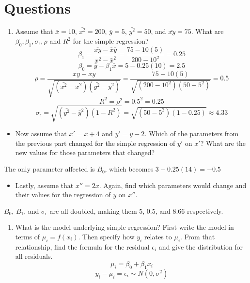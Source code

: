 \documentclass[
]{article}
\providecommand{\tightlist}{%
  \setlength{\itemsep}{0pt}\setlength{\parskip}{0pt}}
\begin{document}
\hypertarget{questions}{%
\section{Questions}\label{questions}}

\begin{enumerate}
\def\labelenumi{\arabic{enumi}.}
\tightlist
\item
  Assume that \(\bar{x}= 10\), \(\bar{x^2} = 200\), \(\bar{y} = 5\),
  \(\bar{y^2} = 50\), and \(\bar{xy} = 75\). What are
  \(\beta_0, \beta_1, \sigma_{\epsilon}, \rho\) and \(R^2\) for the
  simple regression?
  \[\beta_1=\frac{\bar{xy}-\bar{x}\bar{y}}{\bar{x^2}-\bar{x}^2}=\frac{75-10(5)}{200-10^2}=\boxed{0.25}\]
  \[\beta_0=\bar{y}-\beta_1\bar{x}=5-0.25(10)=\boxed{2.5}\]
  \[\rho=\frac{\bar{xy}-\bar{x}\bar{y}}{\sqrt{(\bar{x^2}-\bar{x}^2)(\bar{y^2}-\bar{y}^2)}}=\frac{75-10(5)}{\sqrt{(200-10^2)(50-5^2)}}=\boxed{0.5}\]
  \[R^2=\rho^2=0.5^2=\boxed{0.25}\]
  \[\sigma_\epsilon=\sqrt{(\bar{y^2}-\bar{y}^2)(1-R^2)}=\sqrt{(50-5^2)(1-0.25)}\approx\boxed{4.33}\]
\end{enumerate}

\begin{itemize}
\tightlist
\item
  Now assume that \(x' = x + 4\) and \(y' = y - 2\). Which of the
  parameters from the previous part changed for the simple regression of
  \(y'\) on \(x'\)? What are the new values for those parameters that
  changed?
\end{itemize}

The only parameter affected is \(B_0\), which becomes
\(3-0.25(14)=-0.5\)

\begin{itemize}
\tightlist
\item
  Lastly, assume that \(x'' = 2 x\). Again, find which parameters would
  change and their values for the regression of \(y\) on \(x''\).
\end{itemize}

\(B_0\), \(B_1\), and \(\sigma_\epsilon\) are all doubled, making them
5, 0.5, and 8.66 respectively.

\begin{enumerate}
\def\labelenumi{\arabic{enumi}.}
\setcounter{enumi}{1}
\tightlist
\item
  What is the model underlying simple regression? First write the model
  in terms of \(\mu_i = f(x_i)\). Then specify how \(y_i\) relates to
  \(\mu_i\). From that relationship, find the formula for the residual
  \(\epsilon_i\) and give the distribution for all residuals.
  \[\mu_i=\beta_0+\beta_1x_i\]
  \[y_i-\mu_i=\epsilon_i\sim N(0,\sigma^2)\]
\end{enumerate}
\end{document}
